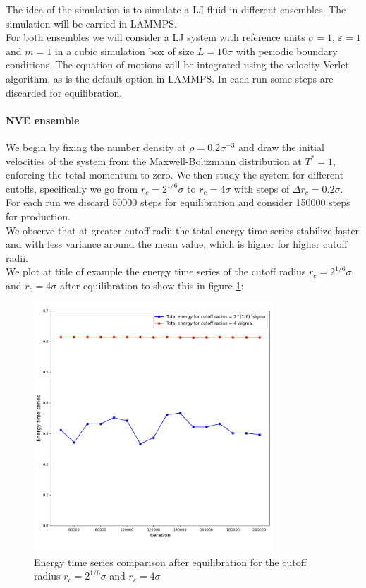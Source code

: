 The idea of the simulation is to simulate a LJ fluid in different ensembles. The simulation will be carried in LAMMPS. \\
For both ensembles we will consider a LJ system with reference units $\sigma=1$, $\varepsilon = 1$ and $m = 1$ in a cubic simulation box of size $L = 10 \sigma$ with periodic boundary conditions. 
The equation of motions will be integrated using the velocity Verlet algorithm, as is the default option in LAMMPS. In each run some steps are discarded for equilibration.

\paragraph{NVE ensemble} We begin by fixing the number density at $\rho = 0.2\sigma^{-3}$ and draw the initial velocities of the system from the Maxwell-Boltzmann distribution at $T^* = 1$, enforcing the total momentum to zero.
We then study the system for different cutoffs, specifically we go from $r_c = 2^{1/6}\sigma$ to $r_c = 4\sigma$ with steps of $\Delta r_c = 0.2\sigma$. \\
For each run we discard 50000 steps for equilibration and consider 150000 steps for production. \\
We observe that at greater cutoff radii the total energy time series stabilize faster and with less variance around the mean value, which is higher for higher cutoff radii. \\
We plot at title of example the energy time series of the cutoff radius $r_c = 2^{1/6}\sigma$ and $r_c = 4\sigma$ after equilibration to show this in figure \ref{ex10:en_comparison}:

\begin{figure}[htp]
    \centering
    \includegraphics[width=0.8\textwidth]{FIG/ex10/energy_time_series.png}
    \caption{Energy time series comparison after equilibration for the cutoff radius $r_c = 2^{1/6}\sigma$ and $r_c = 4\sigma$}
    \label{ex10:en_comparison}
\end{figure}

